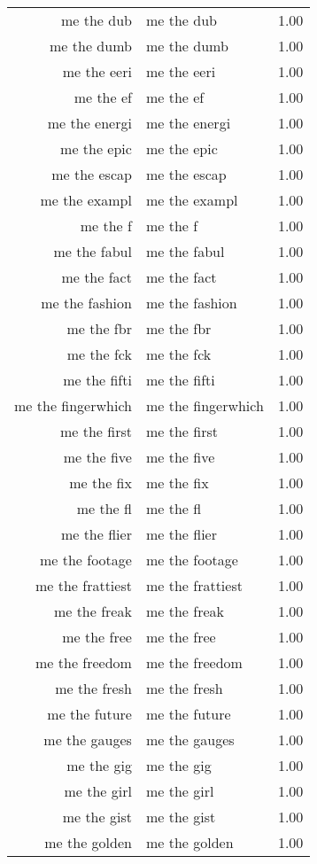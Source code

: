 \begin{table}[ht]
\begin{tabular}{rlr}
  me the dub & me the dub & 1.00 \\ 
  me the dumb & me the dumb & 1.00 \\ 
  me the eeri & me the eeri & 1.00 \\ 
  me the ef & me the ef & 1.00 \\ 
  me the energi & me the energi & 1.00 \\ 
  me the epic & me the epic & 1.00 \\ 
  me the escap & me the escap & 1.00 \\ 
  me the exampl & me the exampl & 1.00 \\ 
  me the f & me the f & 1.00 \\ 
  me the fabul & me the fabul & 1.00 \\ 
  me the fact & me the fact & 1.00 \\ 
  me the fashion & me the fashion & 1.00 \\ 
  me the fbr & me the fbr & 1.00 \\ 
  me the fck & me the fck & 1.00 \\ 
  me the fifti & me the fifti & 1.00 \\ 
  me the fingerwhich & me the fingerwhich & 1.00 \\ 
  me the first & me the first & 1.00 \\ 
  me the five & me the five & 1.00 \\ 
  me the fix & me the fix & 1.00 \\ 
  me the fl & me the fl & 1.00 \\ 
  me the flier & me the flier & 1.00 \\ 
  me the footage & me the footage & 1.00 \\ 
  me the frattiest & me the frattiest & 1.00 \\ 
  me the freak & me the freak & 1.00 \\ 
  me the free & me the free & 1.00 \\ 
  me the freedom & me the freedom & 1.00 \\ 
  me the fresh & me the fresh & 1.00 \\ 
  me the future & me the future & 1.00 \\ 
  me the gauges & me the gauges & 1.00 \\ 
  me the gig & me the gig & 1.00 \\ 
  me the girl & me the girl & 1.00 \\ 
  me the gist & me the gist & 1.00 \\ 
  me the golden & me the golden & 1.00 \\ 

\end{tabular}
\end{table}
